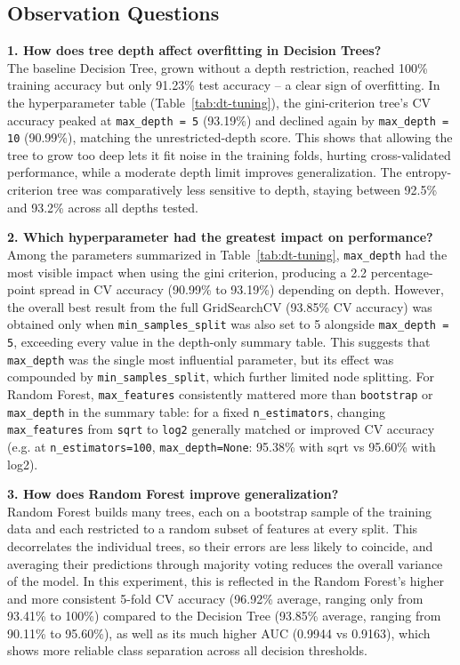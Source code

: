 \documentclass[12pt,a4paper]{article}
\begin{document}
\subsection{Observation Questions}

\textbf{1. How does tree depth affect overfitting in Decision Trees?}\\
The baseline Decision Tree, grown without a depth restriction, reached 100\% training accuracy but only 91.23\% test accuracy -- a clear sign of overfitting. In the hyperparameter table (Table~\ref{tab:dt-tuning}), the gini-criterion tree's CV accuracy peaked at \texttt{max\_depth = 5} (93.19\%) and declined again by \texttt{max\_depth = 10} (90.99\%), matching the unrestricted-depth score. This shows that allowing the tree to grow too deep lets it fit noise in the training folds, hurting cross-validated performance, while a moderate depth limit improves generalization. The entropy-criterion tree was comparatively less sensitive to depth, staying between 92.5\% and 93.2\% across all depths tested.

\textbf{2. Which hyperparameter had the greatest impact on performance?}\\
Among the parameters summarized in Table~\ref{tab:dt-tuning}, \texttt{max\_depth} had the most visible impact when using the gini criterion, producing a 2.2 percentage-point spread in CV accuracy (90.99\% to 93.19\%) depending on depth. However, the overall best result from the full GridSearchCV (93.85\% CV accuracy) was obtained only when \texttt{min\_samples\_split} was also set to 5 alongside \texttt{max\_depth = 5}, exceeding every value in the depth-only summary table. This suggests that \texttt{max\_depth} was the single most influential parameter, but its effect was compounded by \texttt{min\_samples\_split}, which further limited node splitting. For Random Forest, \texttt{max\_features} consistently mattered more than \texttt{bootstrap} or \texttt{max\_depth} in the summary table: for a fixed \texttt{n\_estimators}, changing \texttt{max\_features} from \texttt{sqrt} to \texttt{log2} generally matched or improved CV accuracy (e.g. at \texttt{n\_estimators=100}, \texttt{max\_depth=None}: 95.38\% with sqrt vs 95.60\% with log2).

\textbf{3. How does Random Forest improve generalization?}\\
Random Forest builds many trees, each on a bootstrap sample of the training data and each restricted to a random subset of features at every split. This decorrelates the individual trees, so their errors are less likely to coincide, and averaging their predictions through majority voting reduces the overall variance of the model. In this experiment, this is reflected in the Random Forest's higher and more consistent 5-fold CV accuracy (96.92\% average, ranging only from 93.41\% to 100\%) compared to the Decision Tree (93.85\% average, ranging from 90.11\% to 95.60\%), as well as its much higher AUC (0.9944 vs 0.9163), which shows more reliable class separation across all decision thresholds.
\end{document}

